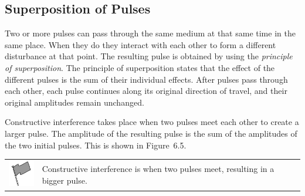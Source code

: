             \subsection{ Superposition of Pulses}
            \nopagebreak
      \label{m38802*id316136}Two or more pulses can pass through the same medium at that same time in the same place. When they do they interact with each other to form a different disturbance at that point. The resulting pulse is obtained by using the \textsl{principle of superposition}. The principle of superposition states that the effect of the different pulses is the sum of their individual effects. After pulses pass through each other, each pulse continues along its original direction of travel, and their original amplitudes remain unchanged.\par 
      \label{m38802*id316148}Constructive interference takes place when two pulses meet each other to create a larger pulse. The amplitude of the resulting pulse is the sum of the amplitudes of the two initial pulses. This is shown in Figure~6.5.\par 
\label{m38802*fhsst!!!underscore!!!id567}\begin{definition}
	  \begin{tabular*}{15 cm}{m{15 mm}m{}}
	\hspace*{-50pt}  \includegraphics[width=0.5in]{col11305.imgs/psflag2.png}   & \Definition{   \label{id2436281}\textbf{ Constructive interference}} { \label{m38802*meaningfhsst!!!underscore!!!id567}
      Constructive interference is when two pulses meet, resulting in a bigger pulse. 
       } 
      \end{tabular*}
      \end{definition}
    \setcounter{subfigure}{0}
